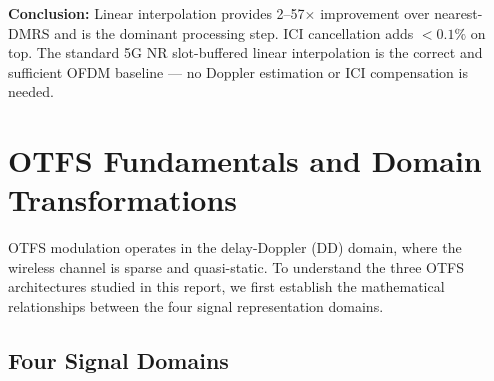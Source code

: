 \documentclass[11pt,a4paper,twoside]{article}
\begin{document}
\textbf{Conclusion:} Linear interpolation provides 2--57$\times$ improvement over nearest-DMRS and is the dominant processing step. ICI cancellation adds $<0.1\%$ on top. The standard 5G NR slot-buffered linear interpolation is the correct and sufficient OFDM baseline --- no Doppler estimation or ICI compensation is needed.


\section{OTFS Fundamentals and Domain Transformations}
\label{sec:otfs_fund}

OTFS modulation \cite{hadani2017} operates in the delay-Doppler (DD) domain, where the wireless channel is sparse and quasi-static. To understand the three OTFS architectures studied in this report, we first establish the mathematical relationships between the four signal representation domains.

\subsection{Four Signal Domains}
\end{document}
